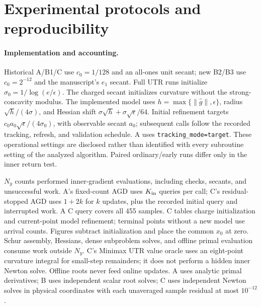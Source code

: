 \section{Experimental protocols and reproducibility}
\label{app:exp-details}

\paragraph{Implementation and accounting.}
\label{app:exp-accounting}
Historical A/B1/C use $c_0=1/128$ and an all-ones unit secant;
new B2/B3 use $c_0=2^{-12}$ and the manuscript's $e_1$ secant.
Full UTR runs initialize $\sigma_0=1/\log(e/\epsilon)$.
The charged secant initializes curvature without the strong-concavity modulus. The implemented model uses
$h=\max\{\|\widehat g\|,\epsilon\}$, radius $\sqrt h/(4\sigma)$,
and Hessian shift $\sigma\sqrt h+\sigma\sqrt\epsilon/64$.
Initial refinement targets $c_0a_0\sqrt\epsilon/(4\sigma_0)$, with
observable secant $a_0$; subsequent calls follow the recorded tracking,
refresh, and validation schedule. A uses \texttt{tracking\_mode=target}.
These operational settings are disclosed rather than identified with
every subroutine setting of the analyzed algorithm. Paired ordinary/early
runs differ only in the inner return test.

$N_y$ counts performed inner-gradient evaluations, including checks,
secants, and unsuccessful work. A's fixed-count AGD uses $K_{\rm in}$
queries per call; C's residual-stopped AGD uses $1+2k$ for $k$ updates,
plus the recorded initial query and interrupted work. A C query covers
all 455 samples. C tables charge initialization and current-point model
refinement; terminal points without a new model use arrival counts.
Figures subtract initialization and place the common $x_0$ at zero.
Schur assembly, Hessians, dense subproblem solves, and offline primal
evaluation consume work outside $N_y$. C's Minimax UTR value oracle uses
an eight-point curvature integral for small-step remainders; it does not
perform a hidden inner Newton solve. Offline roots never feed online
updates. A uses analytic primal derivatives; B uses independent scalar root solves;
C uses independent Newton solves in physical coordinates with each
unaveraged sample residual at most $10^{-12}$.


